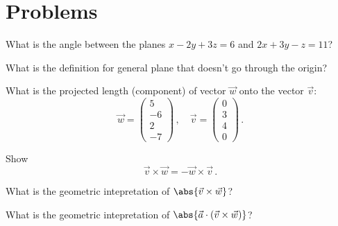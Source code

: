 \documentclass[12pt]{amsart}
\begin{document}
\newpage
\section{Problems}

\begin{question}
	What is the angle between the planes $x - 2y + 3z = 6$ and $2x + 3y -z = 11$?
\end{question}
\vspace{7cm}



\begin{question}
	What is the definition for general plane that doesn't go through the origin?
\end{question}
\vspace{7cm}

\begin{question}
	What is the projected length (component) of vector $\vec{w}$ onto the vector $\vec{v}$:
	\begin{equation*}
		\vec{w} = \begin{pmatrix}
			5 \\ - 6 \\ 2 \\ -7
		\end{pmatrix}
		\,, \quad
		\vec{v} =
		\begin{pmatrix}
			0 \\ 3 \\ 4 \\0
		\end{pmatrix}
		\,.
	\end{equation*}
\end{question}
\vspace{7cm}


\begin{question}
	Show
	\begin{equation*}
		\vec{v} \times \vec{w} = - \vec{w}\times \vec{v} \,.
	\end{equation*}
\end{question}
\vspace{7cm}

\begin{question}
	What is the geometric intepretation of $\abs{\vec{v} \times \vec{w}}$?
\end{question}
\vspace{7cm}


\newpage
\begin{question}
	What is the geometric intepretation of $\abs{\vec{a} \cdot (\vec{v} \times \vec{w})}$?
\end{question}
\vspace{7cm}
\end{document}
